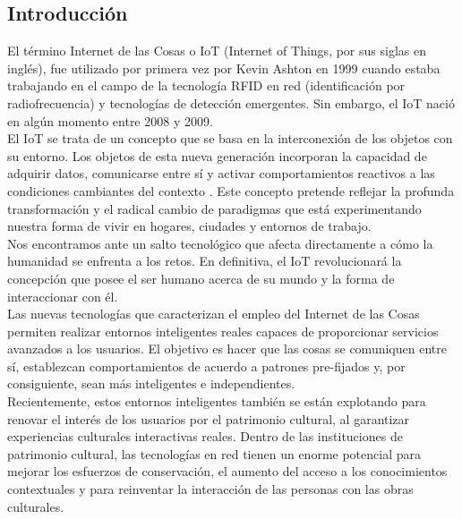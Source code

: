 \renewcommand{\thepage}{\arabic{page}}
\begin{center}
    \section*{\LARGE Introducción}
\end{center}

    \setcounter{page}{1} %
    \pagestyle{plain} %

    El término Internet de las Cosas o IoT (Internet of Things, por sus siglas en inglés), fue utilizado por primera vez por Kevin Ashton en 1999 cuando estaba trabajando en el campo de la tecnología RFID en red (identificación por radiofrecuencia) y tecnologías de detección emergentes. Sin embargo, el IoT nació en algún momento entre 2008 y 2009. \cite{evolucionIoT}\\

    El IoT se trata de un concepto que se basa en la interconexión de los objetos con su entorno. Los objetos de esta nueva generación incorporan la capacidad de adquirir datos, comunicarse entre sí y activar comportamientos reactivos a las condiciones cambiantes del contexto \cite{agriculturaPrecision}. Este concepto pretende reflejar la profunda transformación y el radical cambio de paradigmas que está experimentando nuestra forma de vivir en hogares, ciudades y entornos de trabajo.\\

    Nos encontramos ante un salto tecnológico que afecta directamente a cómo la humanidad se enfrenta a los retos. En definitiva, el IoT revolucionará la concepción que posee el ser humano acerca de su mundo y la forma de interaccionar con él. \cite{revolucionDefinitiva} \\

    Las nuevas tecnologías que caracterizan el empleo del Internet de las Cosas permiten realizar entornos inteligentes reales capaces de proporcionar servicios avanzados a los usuarios. El objetivo es hacer que las cosas se comuniquen entre sí, establezcan comportamientos de acuerdo a patrones pre-fijados y, por consiguiente, sean más inteligentes e independientes.\\
    
    Recientemente, estos entornos inteligentes también se están explotando para renovar el interés de los usuarios por el patrimonio cultural, al garantizar experiencias culturales interactivas reales. Dentro de las instituciones de patrimonio cultural, las tecnologías en red tienen un enorme potencial para mejorar los esfuerzos de conservación, el aumento del acceso a los conocimientos contextuales y para reinventar la interacción de las personas con las obras culturales.\\
    
